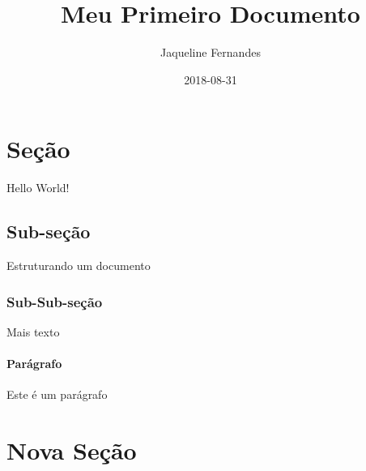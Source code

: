 \documentclass{article}
\title{Meu Primeiro Documento}
\date{2018-08-31}
\author{Jaqueline Fernandes}
\begin{document}
	\maketitle
	\newpage
	
	\section{Seção}
	Hello World!
	
	\subsection{Sub-seção}
	Estruturando um documento
	
	\subsubsection{Sub-Sub-seção}
	Mais texto
	
	\paragraph{Parágrafo}
	Este é um parágrafo
	
	\section{Nova Seção}
\end{document}
